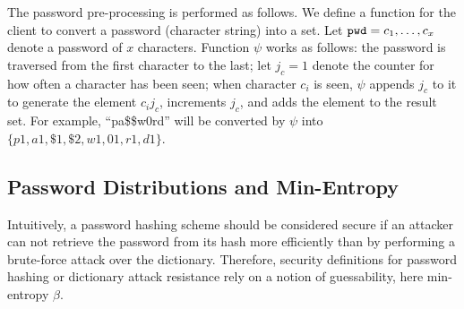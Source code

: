The password pre-processing is performed as follows. 
We define a function \PwdMap for the client to convert a password (character string) into a set. 
Let $\mathtt{pwd}=c_1,\dots,c_x$ denote a password of $x$ characters.
Function $\psi$ works as follows: 
the password is traversed from the first character to the last; 
let $j_c=1$ denote the counter for how often a character has been seen;
when character $c_i$ is seen, $\psi$ appends $j_c$ to it to generate the element $c_ij_c$, increments $j_c$, and adds the element to the result set.
For example, ``pa\$\$w0rd'' will be converted by $\psi$ into $\{p1,a1,\$1,\$2,w1,01,r1,d1\}$. 
 


\subsection{Password Distributions and Min-Entropy} \label{sec:min-entropy}
Intuitively, a password hashing scheme should be considered secure if an attacker can not retrieve the password from its hash more efficiently than by performing a brute-force attack over the dictionary. 
Therefore, security definitions for password hashing or dictionary attack resistance rely on a notion of guessability, here min-entropy $\beta$.

